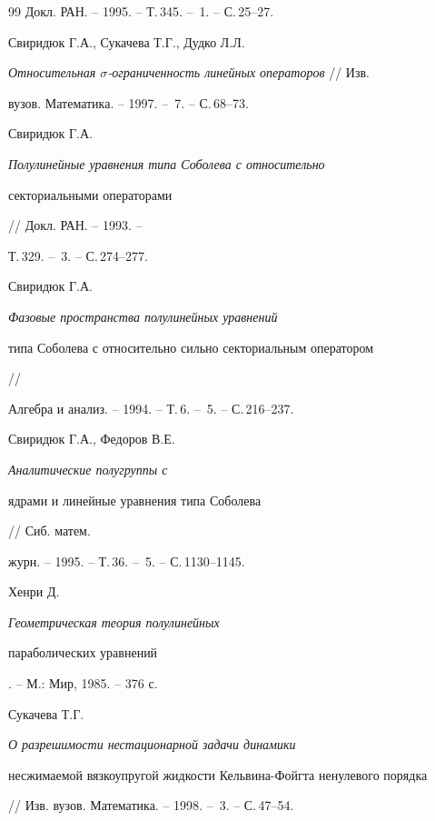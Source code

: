 \begin{thebibliography}{99}
Докл. РАН. -- 1995. -- Т.\,345. -- \No\,1. -- С.\,25--27.




Свиридюк Г.А., Сукачева Т.Г., Дудко Л.Л.


{\it Относительная $\sigma $-ограниченность линейных операторов} // Изв.


вузов. Математика. -- 1997. -- \No\,7. -- С.\,68--73.




Свиридюк Г.А. {\it Полулинейные уравнения типа Соболева с относительно


секториальными операторами} // Докл. РАН. -- 1993. -- 


Т.\,329. -- \No\,3. -- С.\,274--277.




Свиридюк Г.А. {\it Фазовые пространства полулинейных уравнений 


типа Соболева с относительно сильно секториальным оператором} // 


Алгебра и анализ. -- 1994. -- Т.\,6. -- \No\,5. -- С.\,216--237.




Свиридюк Г.А., Федоров В.Е. {\it Аналитические полугруппы с


ядрами и линейные уравнения типа Соболева} // Сиб. матем.


журн. -- 1995. -- Т.\,36. -- \No\,5. -- С.\,1130--1145.




Хенри Д. {\it Геометрическая теория полулинейных


параболических уравнений}. -- М.: Мир, 1985. -- 376 с.




Сукачева Т.Г. {\it О разрешимости нестационарной задачи динамики 


несжимаемой вязкоупругой жидкости Кельвина-Фойгта ненулевого порядка}


// Изв. вузов. Математика. -- 1998. -- \No\,3. -- С.\,47--54.





\end{thebibliography}


\vskip 2cm












\label{end}





